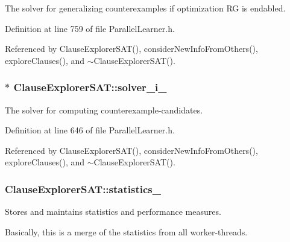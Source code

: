 The solver for generalizing counterexamples if optimization R\-G is endabled. 



Definition at line 759 of file Parallel\-Learner.\-h.



Referenced by Clause\-Explorer\-S\-A\-T(), consider\-New\-Info\-From\-Others(), explore\-Clauses(), and $\sim$\-Clause\-Explorer\-S\-A\-T().

\hypertarget{classClauseExplorerSAT_a65b5b3d04ff5be8bfec60d3dcf86e4d0}{
\subsubsection[{solver\-\_\-i\-\_\-}]{$\ast$ Clause\-Explorer\-S\-A\-T\-::solver\-\_\-i\-\_\-\hspace{0.3cm}{\ttfamily [protected]}}}\label{classClauseExplorerSAT_a65b5b3d04ff5be8bfec60d3dcf86e4d0}


The solver for computing counterexample-\/candidates. 



Definition at line 646 of file Parallel\-Learner.\-h.



Referenced by Clause\-Explorer\-S\-A\-T(), consider\-New\-Info\-From\-Others(), explore\-Clauses(), and $\sim$\-Clause\-Explorer\-S\-A\-T().

\hypertarget{classClauseExplorerSAT_a1d37eb0233177911835bc073fbe1c224}{
\subsubsection[{statistics\-\_\-}]{ Clause\-Explorer\-S\-A\-T\-::statistics\-\_\-\hspace{0.3cm}{\ttfamily [protected]}}}\label{classClauseExplorerSAT_a1d37eb0233177911835bc073fbe1c224}


Stores and maintains statistics and performance measures. 

Basically, this is a merge of the statistics from all worker-\/threads. 


